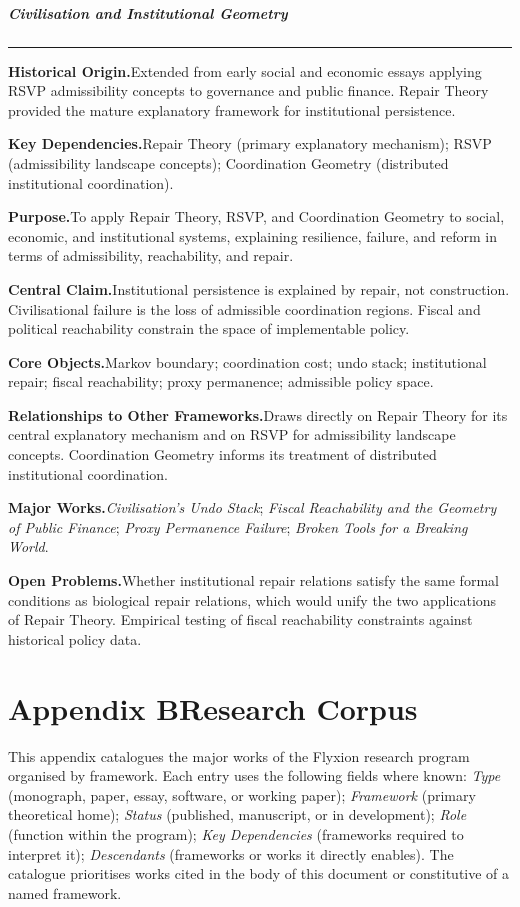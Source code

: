 \documentclass[12pt, twoside]{article}
\newcommand{\frameworkhead}[5]{  \subsubsection{#1}
  \noindent\textcolor{#2}{\rule{\linewidth}{0.8pt}}
  \smallskip

  \noindent\textbf{Historical Origin.}\quad #3

  \noindent\textbf{Key Dependencies.}\quad #4

  \noindent\textbf{Purpose.}\quad #5
}
\newcommand{\frameworkbody}[5]{  \noindent\textbf{Central Claim.}\quad #1

  \noindent\textbf{Core Objects.}\quad #2

  \noindent\textbf{Relationships to Other Frameworks.}\quad #3

  \noindent\textbf{Major Works.}\quad #4

  \noindent\textbf{Open Problems.}\quad #5
  \medskip
}
\begin{document}
\frameworkhead{Civilisation and Institutional Geometry}{applviolet}{Extended from early social and economic essays applying RSVP admissibility
concepts to governance and public finance. Repair Theory provided the mature
explanatory framework for institutional persistence.}{Repair Theory (primary explanatory mechanism); RSVP (admissibility
landscape concepts); Coordination Geometry (distributed institutional
coordination).}{To apply Repair Theory, RSVP, and Coordination Geometry to social, economic,
and institutional systems, explaining resilience, failure, and reform in terms
of admissibility, reachability, and repair.}
\frameworkbody{Institutional persistence is explained by repair, not construction.
Civilisational failure is the loss of admissible coordination regions. Fiscal
and political reachability constrain the space of implementable policy.}{Markov boundary; coordination cost; undo stack; institutional repair; fiscal
reachability; proxy permanence; admissible policy space.}{Draws directly on Repair Theory for its central explanatory mechanism and on
RSVP for admissibility landscape concepts. Coordination Geometry informs its
treatment of distributed institutional coordination.}{\emph{Civilisation's Undo Stack}; \emph{Fiscal Reachability and the Geometry
of Public Finance}; \emph{Proxy Permanence Failure}; \emph{Broken Tools for a
Breaking World}.}{Whether institutional repair relations satisfy the same formal conditions as
biological repair relations, which would unify the two applications of Repair
Theory. Empirical testing of fiscal reachability constraints against
historical policy data.}

\part*{Appendix B\quad Research Corpus}

\noindent
This appendix catalogues the major works of the Flyxion research program
organised by framework. Each entry uses the following fields where known:
\textit{Type} (monograph, paper, essay, software, or working paper);
\textit{Framework} (primary theoretical home); \textit{Status} (published,
manuscript, or in development); \textit{Role} (function within the program);
\textit{Key Dependencies} (frameworks required to interpret it);
\textit{Descendants} (frameworks or works it directly enables). The catalogue
prioritises works cited in the body of this document or constitutive of a
named framework.
\end{document}
